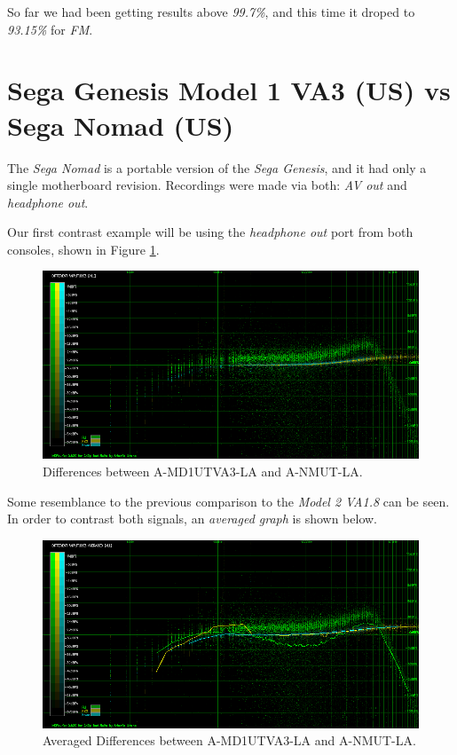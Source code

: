 \documentclass[10pt,a4paper]{report}
\begin{document}
So far we had been getting results above \textit{99.7\%}, and this time it droped to \textit{93.15\%} for \textit{FM}.

\section{Sega Genesis Model 1 VA3 (US) vs\\ Sega Nomad (US)}

The \textit{Sega Nomad} is a portable version of the \textit{Sega Genesis}, and it had only a single motherboard revision. Recordings were made via both: \textit{AV out} and \textit{headphone out}. 

Our first contrast example will be using the \textit{headphone out} port from both consoles, shown in Figure \ref{fig:A-MD1UTVA3-LA_vs_A-NMUT-LA}.

\begin{figure}[H]
	\centering
	\includegraphics[width=1.0\linewidth]{images/results/6-A-MD1UTVA3-LA_vs_A-NMUT-LA.png}
	\caption[A-MD1UTVA3-LA vs A-NMUT-LA]{Differences between A-MD1UTVA3-LA and A-NMUT-LA.}
	\label{fig:A-MD1UTVA3-LA_vs_A-NMUT-LA}
\end{figure}

Some resemblance to the previous comparison to the \textit{Model 2 VA1.8} can be seen. In order to contrast both signals, an \textit{averaged graph} is shown below.

\begin{figure}[H]
	\centering
	\includegraphics[width=1.0\linewidth]{images/results/6-A-MD1UTVA3-LA_vs_A-NMUT-LA-AVG.png}
	\caption[A-MD1UTVA3-LA vs A-NMUT-LA AVG]{Averaged Differences between A-MD1UTVA3-LA and A-NMUT-LA.}
	\label{fig:A-MD1UTVA3-LA_vs_A-NMUT-LA_AVG}
\end{figure}
\end{document}
